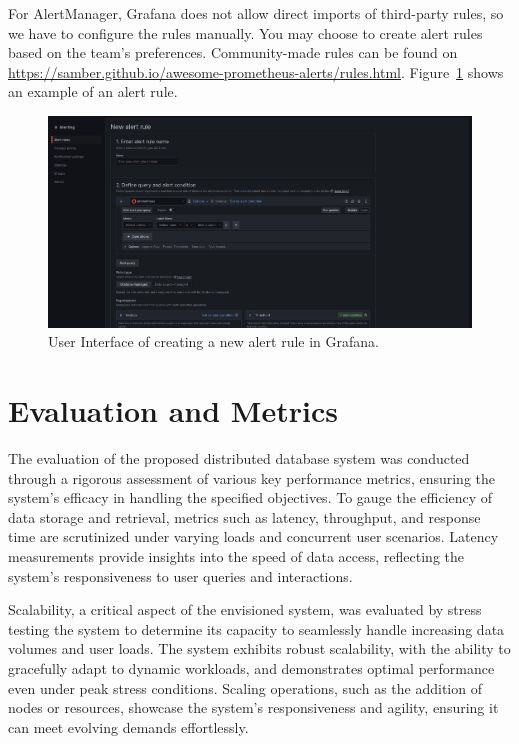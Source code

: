 \documentclass{report}
\begin{document}
    For AlertManager, Grafana does not allow direct imports of third-party rules, so we have to configure the rules manually. You may choose to create alert rules based on the team's preferences. Community-made rules can be found on \url{https://samber.github.io/awesome-prometheus-alerts/rules.html}. Figure~\ref{fig:alerting-create} shows an example of an alert rule.

    \begin{figure}[h]
        \centering
        \includegraphics[width=\textwidth]{images/alerting-create}
        \caption{User Interface of creating a new alert rule in Grafana.}
        \label{fig:alerting-create}
    \end{figure}

    \section{Evaluation and Metrics}
    The evaluation of the proposed distributed database system was conducted through a rigorous assessment of various key performance metrics, ensuring the system's efficacy in handling the specified objectives. To gauge the efficiency of data storage and retrieval, metrics such as latency, throughput, and response time are scrutinized under varying loads and concurrent user scenarios. Latency measurements provide insights into the speed of data access, reflecting the system's responsiveness to user queries and interactions.
    
    Scalability, a critical aspect of the envisioned system, was evaluated by stress testing the system to determine its capacity to seamlessly handle increasing data volumes and user loads. The system exhibits robust scalability, with the ability to gracefully adapt to dynamic workloads, and demonstrates optimal performance even under peak stress conditions. Scaling operations, such as the addition of nodes or resources, showcase the system's responsiveness and agility, ensuring it can meet evolving demands effortlessly.
    
\end{document}
